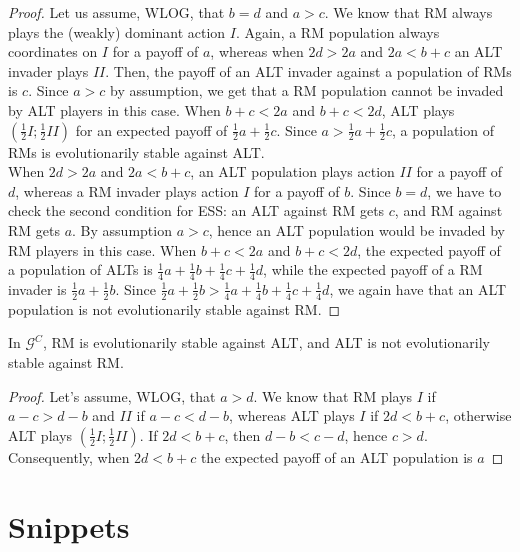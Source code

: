 \documentclass[fleqn,reqno,11pt]{article}
\begin{document}
\begin{proof}
Let us assume, WLOG, that $b=d$ and $a>c$. We know that RM always plays the (weakly) dominant action $I$. Again, a RM population always coordinates on $I$ for a payoff of $a$, whereas when $2d > 2a$ and $2a < b+c$ an ALT invader plays $II$. Then, the payoff of an ALT invader against a population of RMs is $c$. Since $a>c$ by assumption, we get that a RM population cannot be invaded by ALT players in this case. When $b+c < 2a$ and $b+c < 2d$, ALT plays $(\frac{1}{2}I;\frac{1}{2}II)$ for an expected payoff of $\frac{1}{2} a + \frac{1}{2} c$. Since $a > \frac{1}{2} a + \frac{1}{2} c$, a population of RMs is evolutionarily stable against ALT. \\
When $2d > 2a$ and $2a < b+c$, an ALT population plays action $II$ for a payoff of $d$, whereas a RM invader plays action $I$ for a payoff of $b$. Since $b=d$, we have to check the second condition for ESS: an ALT against RM gets $c$, and RM against RM gets $a$. By assumption $a>c$, hence an ALT population would be invaded by RM players in this case. 
When $b+c < 2a$ and $b+c < 2d$, the expected payoff of a population of ALTs is $\frac{1}{4}a+\frac{1}{4}b+\frac{1}{4}c+\frac{1}{4}d$, while the expected payoff of a RM invader is $\frac{1}{2}a+\frac{1}{2}b$. Since $\frac{1}{2}a+\frac{1}{2}b > \frac{1}{4}a+\frac{1}{4}b+\frac{1}{4}c+\frac{1}{4}d$, we again have that an ALT population is not evolutionarily stable against RM.
\end{proof}

\begin{lemma}
In $\mathcal{G}^C$, RM is evolutionarily stable against ALT, and ALT is not evolutionarily stable against RM. 
\end{lemma}

\begin{proof}
Let's assume, WLOG, that $a>d$. We know that RM plays $I$ if $ a-c > d-b $ and $II$ if $ a-c < d-b $, whereas  ALT plays $I$ if $2d<b+c$, otherwise ALT plays $(\frac{1}{2}I;\frac{1}{2}II)$. If $2d<b+c$, then $d-b<c-d$, hence $c>d$. Consequently, when $2d<b+c$ the expected payoff of an ALT population is $a$
\end{proof}






\printbibliography[heading=bibintoc]


\newpage

\section{Snippets}
\end{document}
